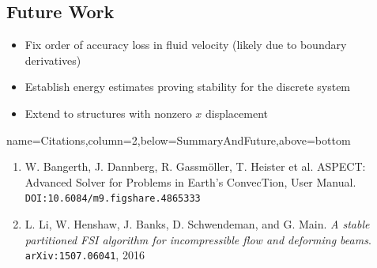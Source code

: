 \documentclass[
paperwidth=48in,paperheight=36in,
fontscale=0.4
]{baposter}
\begin{document}
\begin{poster}
{\subsection{Future Work}
    \begin{itemize}
        \item Fix order of accuracy loss in fluid velocity (likely due to
              boundary derivatives)
        \item Establish energy estimates proving stability for the discrete
              system
        \item Extend to structures with nonzero \(x\) displacement
    \end{itemize}
}

          {name=Citations,column=2,below=SummaryAndFuture,above=bottom}
{
\begin{enumerate}
    \item W. Bangerth, J. Dannberg, R. Gassm{\"o}ller, T. Heister et al.
          \textsc{ASPECT}: Advanced Solver for Problems in Earth's ConvecTion,
          User Manual. \texttt{DOI:10.6084/m9.figshare.4865333}
    \item L. Li, W. Henshaw, J. Banks, D. Schwendeman, and G. Main. \emph{A
          stable partitioned FSI algorithm for incompressible flow and deforming
          beams}. \texttt{arXiv:1507.06041}, 2016
\end{enumerate}
}



\end{poster}%
\end{document}
